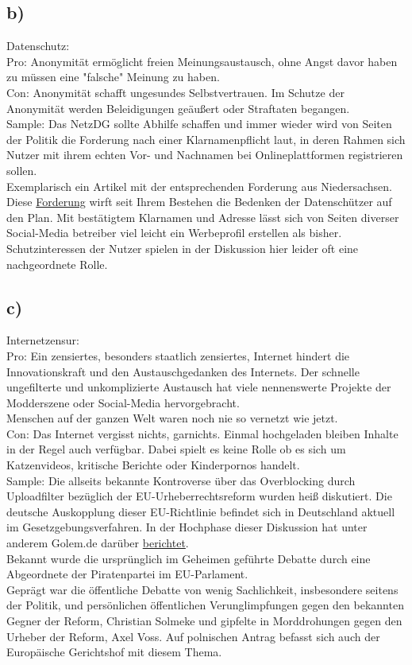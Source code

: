 \documentclass{article}
\begin{document}
	\subsection*{b)}
	Datenschutz: \\
	Pro: Anonymität ermöglicht freien Meinungsaustausch, ohne Angst davor haben zu müssen eine "falsche" Meinung zu haben. \\
	Con: Anonymität schafft ungesundes Selbstvertrauen. Im Schutze der Anonymität werden Beleidigungen geäußert oder Straftaten begangen. \\
	Sample: Das NetzDG sollte Abhilfe schaffen und immer wieder wird von Seiten der Politik die Forderung nach einer Klarnamenpflicht laut, in deren Rahmen sich Nutzer mit ihrem echten Vor- und Nachnamen bei Onlineplattformen registrieren sollen. \\
	Exemplarisch ein Artikel mit der entsprechenden Forderung aus Niedersachsen. \\
	Diese \href{https://www.deutschlandfunknova.de/beitrag/identifizierungspflicht-fuer-weniger-anonymitaet-auf-facebook-instagram-twitch-und-co}{Forderung} wirft seit Ihrem Bestehen die Bedenken der Datenschützer auf den Plan. Mit bestätigtem Klarnamen und Adresse lässt sich von Seiten diverser Social-Media betreiber viel leicht ein Werbeprofil erstellen als bisher. Schutzinteressen der Nutzer spielen in der Diskussion hier leider oft eine nachgeordnete Rolle.
	\subsection*{c)}
	Internetzensur: \\
	Pro: Ein zensiertes, besonders staatlich zensiertes, Internet hindert die Innovationskraft und den Austauschgedanken des Internets. Der schnelle ungefilterte und unkomplizierte Austausch hat viele nennenswerte Projekte der Modderszene oder Social-Media hervorgebracht. \\
	Menschen auf der ganzen Welt waren noch nie so vernetzt wie jetzt. \\
	Con: Das Internet vergisst nichts, garnichts. Einmal hochgeladen bleiben Inhalte in der Regel auch verfügbar. Dabei spielt es keine Rolle ob es sich um Katzenvideos, kritische Berichte oder Kinderpornos handelt. \\
	Sample: Die allseits bekannte Kontroverse über das Overblocking durch Uploadfilter bezüglich der EU-Urheberrechtsreform wurden heiß diskutiert. Die deutsche Auskopplung dieser EU-Richtlinie befindet sich in Deutschland aktuell im Gesetzgebungsverfahren. In der Hochphase dieser Diskussion hat unter anderem Golem.de darüber \href{https://www.golem.de/news/urheberrechtsdebatte-eine-einzige-piratin-hat-die-debatte-versaut-2002-146496.html}{berichtet}. \\
	Bekannt wurde die ursprünglich im Geheimen geführte Debatte durch eine Abgeordnete der Piratenpartei im EU-Parlament. \\
	Geprägt war die öffentliche Debatte von wenig Sachlichkeit, insbesondere seitens der Politik, und persönlichen öffentlichen Verunglimpfungen gegen den bekannten Gegner der Reform, Christian Solmeke und gipfelte in Morddrohungen gegen den Urheber der Reform, Axel Voss. Auf polnischen Antrag befasst sich auch der Europäische Gerichtshof mit diesem Thema.
\end{document}
